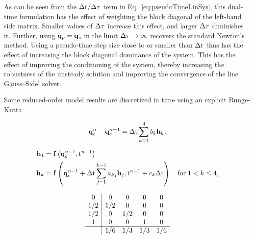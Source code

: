 As can be seen from the $\Delta \text{t}/\Delta \tau$ term in Eq.~\ref{eq:pseudoTimeLinSys}, this dual-time formulation has the effect of weighting the block diagonal of the left-hand side matrix. Smaller values of $\Delta \tau$ increase this effect, and larger $\Delta \tau$ diminishes it. Further, using $\mathbf{q}_p = \mathbf{q}_c$ in the limit $\Delta \tau \rightarrow \infty$ recovers the standard Newton's method. Using a pseudo-time step size close to or smaller than $\Delta \text{t}$ thus has the effect of increasing the block diagonal dominance of the system. This has the effect of improving the conditioning of the system, thereby increasing the robustness of the unsteady solution and improving the convergence of the line Gauss--Sidel solver.

Some reduced-order model results are discretized in time using an explicit Runge-Kutta

\begin{equation}\label{eq:expRK}
    \mathbf{q}_c^{n} - \mathbf{q}_c^{n-1} = \Delta \text{t} \sum_{k = 1}^{4} b_{k} \mathbf{h}_{k},
\end{equation}

\begin{align}
    \mathbf{h}_1 &= \mathbf{f} \left(\mathbf{q}_c^{n - 1}, \text{t}^{n-1}\right) \\
    \mathbf{h}_{k} &= \mathbf{f} \left(\mathbf{q}_c^{n-1} + \Delta \text{t} \sum_{j = 1}^{k-1} a_{k j} \mathbf{h}_{j}, \text{t}^{n-1} + c_{k} \Delta \text{t}\right) \quad \text{for} \; 1 < k \le 4,
\end{align}

\[
    \begin{array}
		{c|cccc}
		0 & 0 & 0 & 0 & 0 \\
		1/2 & 1/2 & 0 & 0 & 0 \\
		1/2 & 0 & 1/2 & 0 & 0 \\
		1 & 0 & 0 & 1 & 0 \\
		\hline
		& 1/6 & 1/3 & 1/3 & 1/6
    \end{array}
\]